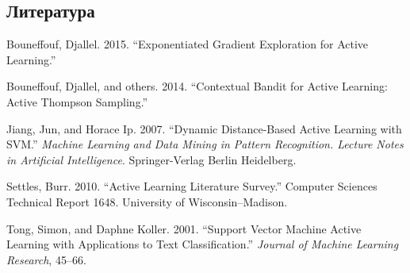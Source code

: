 \documentclass[]{article}
\begin{document}
\subsection*{Литература}\label{ux43bux438ux442ux435ux440ux430ux442ux443ux440ux430}

\hypertarget{refs}{}
\hypertarget{ref-Bouneffouf2}{}
Bouneffouf, Djallel. 2015. ``Exponentiated Gradient Exploration for
Active Learning.''

\hypertarget{ref-Bouneffouf1}{}
Bouneffouf, Djallel, and others. 2014. ``Contextual Bandit for Active
Learning: Active Thompson Sampling.''

\hypertarget{ref-DDBAL}{}
Jiang, Jun, and Horace Ip. 2007. ``Dynamic Distance-Based Active
Learning with SVM.'' \emph{Machine Learning and Data Mining in Pattern
Recognition. Lecture Notes in Artificial Intelligence}. Springer-Verlag
Berlin Heidelberg.

\hypertarget{ref-Settles}{}
Settles, Burr. 2010. ``Active Learning Literature Survey.'' Computer
Sciences Technical Report 1648. University of Wisconsin--Madison.

\hypertarget{ref-TongKoller}{}
Tong, Simon, and Daphne Koller. 2001. ``Support Vector Machine Active
Learning with Applications to Text Classification.'' \emph{Journal of
Machine Learning Research}, 45--66.
\end{document}
